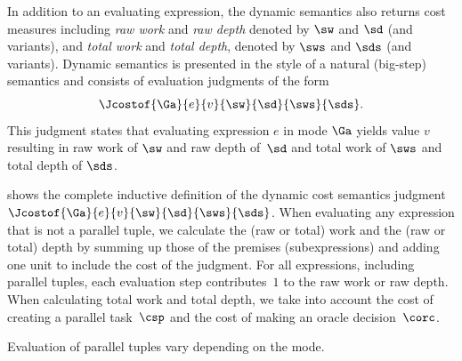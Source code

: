 In addition to an evaluating expression, the dynamic semantics also
returns cost measures including {\em raw work} and {\em raw depth}
denoted by $\sw$ and $\sd$ (and variants), and {\em total work} and {\em
  total depth}, denoted by $\sws$ and $\sds$ (and variants).  Dynamic
semantics is presented in the style of a natural (big-step) semantics
and consists of evaluation judgments of the form
$$\Jcostof{\Ga}{ e }{v}{\sw}{\sd}{\sws}{\sds}.$$ 
This judgment states
that evaluating expression $e$ in mode $\Ga$ yields value $v$
resulting in raw work of $\sw$ and raw depth of~$\sd$ and total work
of $\sws$ and total depth of $\sds$.  

 
 shows the complete inductive definition of the
dynamic cost semantics judgment $\Jcostof{\Ga}{ e
}{v}{\sw}{\sd}{\sws}{\sds}$.  When evaluating any expression that is
not a parallel tuple, we calculate the (raw or total) work and the
(raw or total) depth by summing up those of the premises
(subexpressions) and adding one unit to include the cost of the
judgment.  For all expressions, including parallel tuples, each
evaluation step contributes~$1$ to the raw work or raw depth.  When
calculating total work and total depth, we take into account the cost
of creating a parallel task~$\csp$ and the cost of making an oracle
decision~$\corc$.

Evaluation of parallel tuples vary depending on the mode.  

